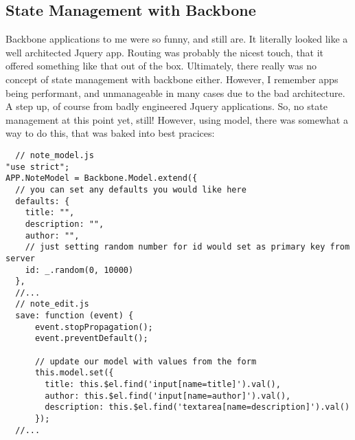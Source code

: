 \subsection{ State Management with Backbone }
Backbone applications to me were so funny, and still are. It literally looked
like a well architected Jquery app. Routing was probably the nicest touch, that
it offered something like that out of the box. Ultimately, there really was no
concept of state management with backbone either. However, I remember apps being
performant, and unmanageable in many cases due to the bad architecture. A step
up, of course from badly engineered Jquery applications. So, no state management
at this point yet, still! However, using model, there was somewhat a way to do
this, that was baked into best pracices:

\begin{lstlisting}
  // note_model.js
"use strict";
APP.NoteModel = Backbone.Model.extend({
  // you can set any defaults you would like here
  defaults: {
    title: "",
    description: "",
    author: "",
    // just setting random number for id would set as primary key from server
    id: _.random(0, 10000)
  },
  //...
  // note_edit.js
  save: function (event) {
      event.stopPropagation();
      event.preventDefault();

      // update our model with values from the form
      this.model.set({
        title: this.$el.find('input[name=title]').val(),
        author: this.$el.find('input[name=author]').val(),
        description: this.$el.find('textarea[name=description]').val()
      });
  //...

\end{lstlisting}

